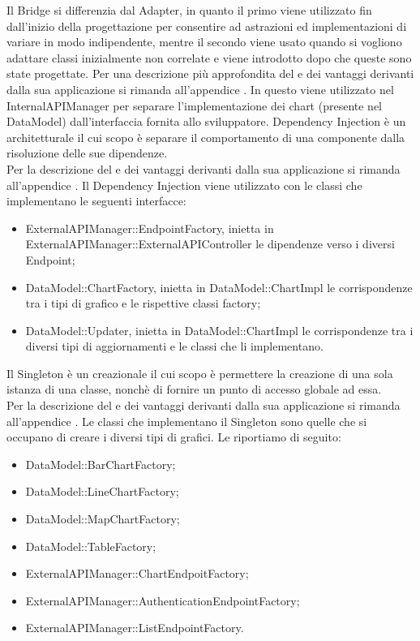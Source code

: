 			Il  Bridge si differenzia dal  Adapter, in quanto il primo viene utilizzato fin dall'inizio della progettazione per consentire ad astrazioni ed implementazioni di variare in modo indipendente, mentre il secondo viene usato quando si vogliono adattare classi inizialmente non correlate e viene introdotto dopo che queste sono state progettate.
			Per una descrizione più approfondita del  e dei vantaggi derivanti dalla sua applicazione si rimanda all'appendice .
				In  questo  viene utilizzato nel  InternalAPIManager per separare l'implementazione dei chart (presente nel  DataModel) dall'interfaccia fornita allo sviluppatore.	
			Dependency Injection è un  architetturale il cui scopo è separare il comportamento di una componente dalla risoluzione delle sue dipendenze.\\
			Per la descrizione del  e dei vantaggi derivanti dalla sua applicazione si rimanda all'appendice .
				Il  Dependency Injection viene utilizzato con le classi che implementano le seguenti interfacce:
				\begin{itemize}
					\item ExternalAPIManager::EndpointFactory, inietta in ExternalAPIManager::ExternalAPIController le dipendenze verso i diversi Endpoint;
					\item DataModel::ChartFactory, inietta in DataModel::ChartImpl le  corrispondenze tra i tipi di grafico e le rispettive classi factory;
					\item DataModel::Updater, inietta in DataModel::ChartImpl le corrispondenze tra i diversi tipi di aggiornamenti e le classi che li implementano.
				\end{itemize}
				Il Singleton è un  creazionale il cui scopo è permettere la creazione di una sola istanza di una classe, nonchè di fornire un punto di accesso globale ad essa.\\
				Per la descrizione del  e dei vantaggi derivanti dalla sua applicazione si rimanda all'appendice .
					Le classi che implementano il Singleton sono quelle che si occupano di creare i diversi tipi di grafici. Le riportiamo di seguito:
					\begin{itemize}
						\item DataModel::BarChartFactory;
						\item DataModel::LineChartFactory;
						\item DataModel::MapChartFactory;
						\item DataModel::TableFactory;
						\item ExternalAPIManager::ChartEndpoitFactory;
						\item ExternalAPIManager::AuthenticationEndpointFactory;
						\item ExternalAPIManager::ListEndpointFactory.
					\end{itemize}
